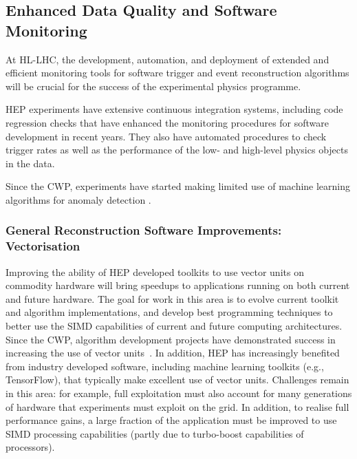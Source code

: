 \hypertarget{enhanced-data-quality-and-software-monitoring-for-trigger-and-reconstruction}{%
\subsection{Enhanced Data Quality and Software Monitoring}\label{enhanced-data-quality-and-software-monitoring-for-trigger-and-reconstruction}}

At HL-LHC, the development, automation, and deployment of extended and
efficient monitoring tools for software trigger and event reconstruction
algorithms will be crucial for the success of the experimental physics
programme.

HEP experiments have extensive continuous integration systems, including
code regression checks that have enhanced the monitoring procedures for
software development in recent years. They also have automated
procedures to check trigger rates as well as the performance of the low-
and high-level physics objects in the data. %

Since the CWP, experiments have started making limited use of machine
learning algorithms for anomaly detection \cite{Adinolfi:2298467,CMSMonitoring}.

\hypertarget{general-reconstruction-software-improvements-vectorisation}{%
\subsubsection{General Reconstruction Software Improvements:
Vectorisation}\label{general-reconstruction-software-improvements-vectorization}}

Improving the ability of HEP developed toolkits to use vector units on
commodity hardware will bring speedups to applications running on both
current and future hardware. The goal for work in this area is to evolve
current toolkit and algorithm implementations, and develop best programming
techniques to better use the SIMD capabilities of current and future
computing architectures. Since the CWP, algorithm development projects
have demonstrated success in increasing the use of vector
units~\cite{cerati2019speeding, LHCB-FIGURE-2019-002}. In addition, HEP has increasingly benefited from industry
developed software, including machine learning toolkits (e.g.,
TensorFlow), that typically make excellent use of vector units.
Challenges remain in this area: for example, full exploitation
must also account for many generations of hardware that experiments must
exploit on the grid. In addition, to realise full performance gains, a
large fraction of the application must be improved to use SIMD processing
capabilities (partly due to turbo-boost capabilities of processors).

